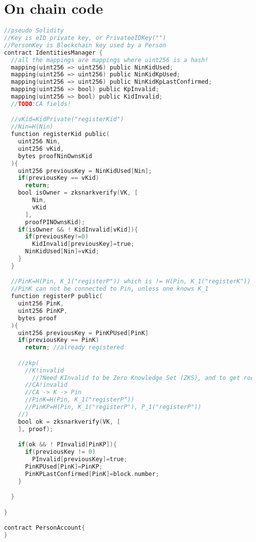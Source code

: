 \documentclass{article}
\begin{document}
\section{On chain code}
\begin{lstlisting}[language=C, frame=single, style=b]
//pseudo Solidity
//Key is eID private key, or PrivateeIDKey("")
//PersonKey is Blockchain key used by a Person
contract IdentitiesManager {
  //all the mappings are mappings where uint256 is a hash!
  mapping(uint256 => uint256) public NinKidUsed;
  mapping(uint256 => uint256) public NinKidKpUsed;
  mapping(uint256 => uint256) public NinKidKpLastConfirmed;
  mapping(uint256 => bool) public KpInvalid;
  mapping(uint256 => bool) public KidInvalid;
  //TODO:CA fields!

  //vKid=KidPrivate("registerKid")
  //Nin=H(Nin)
  function registerKid public(
    uint256 Nin,
    uint256 vKid,
    bytes proofNinOwnsKid
  ){
    uint256 previousKey = NinKidUsed[Nin];
    if(previousKey == vKid)
      return;
    bool isOwner = zksnarkverify(VK, [
        Nin, 
        vKid
      ],
      proofPINOwnsKid);
    if(isOwner && ! KidInvalid[vKid]){
      if(previousKey!=0)
        KidInvalid[previousKey]=true;
      NinKidUsed[Nin]=vKid;
    }
  }

  //PinK=H(Pin, K_1("registerP")) which is != H(Pin, K_1("registerK"))
  //PinK can not be connected to Pin, unless one knows K_1
  function registerP public(
    uint256 PinK,
    uint256 PinKP,
    bytes proof
  ){
    uint256 previousKey = PinKPUsed[PinK]
    if(previousKey == PinK)
      return; //already registered

    //zkp(
      //K!invalid
        //?Need KInvalid to be Zero Knowledge Set (ZKS), and to get roots
      //CA!invalid
      //CA -> K -> Pin
      //PinK=H(Pin, K_1("registerP"))
      //PinKP=H(Pin, K_1("registerP"), P_1("registerP"))
    //)
    bool ok = zksnarkverify(VK, [
    ], proof);

    if(ok && ! PInvalid[PinKP]){
      if(previousKey != 0)
        PInvalid[previousKey]=true;
      PinKPUsed[PinK]=PinKP;
      PinKPLastConfirmed[PinK]=block.number;
    }

  }

}

contract PersonAccount{
}
\end{lstlisting}

\newpage
\end{document}
